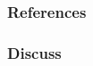 \documentclass[xcolor={usenames,dvipsnames,svgnames}, compress]{beamer}
\begin{document}
\begin{frame}
  \frametitle{References}
  \setlength\bibitemsep{8pt}
  \printbibliography
\end{frame}

\begin{frame}
  \frametitle{Discuss}
  
\end{frame}






  
   
\end{document}
